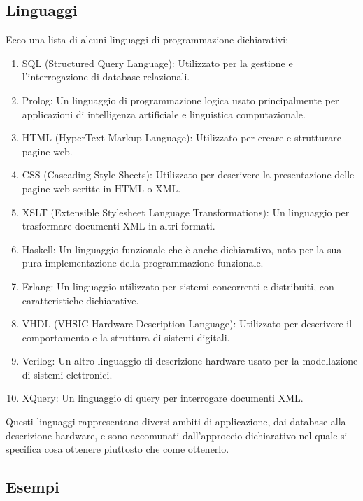 \documentclass[
  letterpaper,
]{scrbook}
\providecommand{\tightlist}{%
  \setlength{\itemsep}{0pt}\setlength{\parskip}{0pt}}\usepackage{longtable,booktabs,array}
\begin{document}
\subsection{Linguaggi}\label{linguaggi}

Ecco una lista di alcuni linguaggi di programmazione dichiarativi:

\begin{enumerate}
\def\labelenumi{\arabic{enumi}.}
\tightlist
\item
  SQL (Structured Query Language): Utilizzato per la gestione e
  l'interrogazione di database relazionali.
\item
  Prolog: Un linguaggio di programmazione logica usato principalmente
  per applicazioni di intelligenza artificiale e linguistica
  computazionale.
\item
  HTML (HyperText Markup Language): Utilizzato per creare e strutturare
  pagine web.
\item
  CSS (Cascading Style Sheets): Utilizzato per descrivere la
  presentazione delle pagine web scritte in HTML o XML.
\item
  XSLT (Extensible Stylesheet Language Transformations): Un linguaggio
  per trasformare documenti XML in altri formati.
\item
  Haskell: Un linguaggio funzionale che è anche dichiarativo, noto per
  la sua pura implementazione della programmazione funzionale.
\item
  Erlang: Un linguaggio utilizzato per sistemi concorrenti e
  distribuiti, con caratteristiche dichiarative.
\item
  VHDL (VHSIC Hardware Description Language): Utilizzato per descrivere
  il comportamento e la struttura di sistemi digitali.
\item
  Verilog: Un altro linguaggio di descrizione hardware usato per la
  modellazione di sistemi elettronici.
\item
  XQuery: Un linguaggio di query per interrogare documenti XML.
\end{enumerate}

Questi linguaggi rappresentano diversi ambiti di applicazione, dai
database alla descrizione hardware, e sono accomunati dall'approccio
dichiarativo nel quale si specifica cosa ottenere piuttosto che come
ottenerlo.

\subsection{Esempi}\label{esempi}
\end{document}
